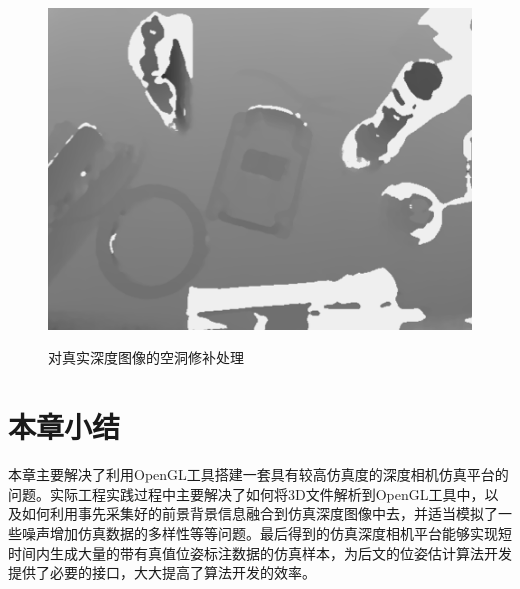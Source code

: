 \begin{figure}[htb]
{		\includegraphics[scale=0.7]{./mypic/空洞修补2.png} 
}
\caption{对真实深度图像的空洞修补处理}
\end{figure}


\section{本章小结}

本章主要解决了利用OpenGL工具搭建一套具有较高仿真度的深度相机仿真平台的问题。实际工程实践过程中主要解决了如何将3D文件解析到OpenGL工具中，以及如何利用事先采集好的前景背景信息融合到仿真深度图像中去，并适当模拟了一些噪声增加仿真数据的多样性等等问题。最后得到的仿真深度相机平台能够实现短时间内生成大量的带有真值位姿标注数据的仿真样本，为后文的位姿估计算法开发提供了必要的接口，大大提高了算法开发的效率。







